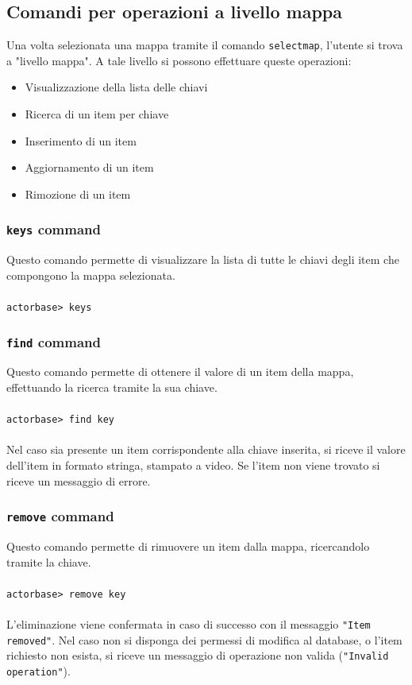 \documentclass[a4paper]{article}
\begin{document}
	\subsection{Comandi per operazioni a livello mappa}
	Una volta selezionata una mappa tramite il comando \texttt{selectmap}, l'utente si trova a "livello mappa". A tale livello si possono effettuare queste operazioni:
	\begin{itemize}
		\item Visualizzazione della lista delle chiavi
		\item Ricerca di un item per chiave
		\item Inserimento di un item 
		\item Aggiornamento di un item
		\item Rimozione di un item
	\end{itemize}

	\subsubsection{\texttt{keys} command}
	Questo comando permette di visualizzare la lista di tutte le chiavi degli item che compongono la mappa selezionata.
	\\ \\
	\texttt{actorbase>	keys}

	\subsubsection{\texttt{find} command}
	Questo comando permette di ottenere il valore di un item della mappa, effettuando la ricerca tramite la sua chiave.
	\\ \\
	\texttt{actorbase>	find key}
	\\ \\
	Nel caso sia presente un item corrispondente alla chiave inserita, si riceve il valore dell'item in formato stringa, stampato a video. Se l'item non viene trovato si riceve un messaggio di errore.
	\subsubsection{\texttt{remove} command}
	Questo comando permette di rimuovere un item dalla mappa, ricercandolo tramite la chiave.
	\\ \\
	\texttt{actorbase>	remove key}
	\\ \\
	L'eliminazione viene confermata in caso di successo con il messaggio \texttt{"Item removed"}. Nel caso non si disponga dei permessi di modifica al database, o l'item 
	richiesto non esista, si riceve un messaggio di operazione non valida (\texttt{"Invalid operation"}).
\end{document}
